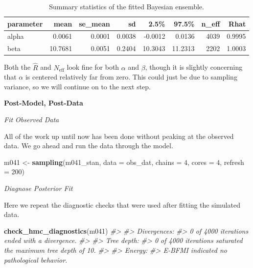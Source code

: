 \documentclass[11pt, oneside, openany]{scrbook}
\newenvironment{Shaded}{\begin{snugshade}}{\end{snugshade}}
\newcommand{\CommentTok}[1]{\textcolor[rgb]{0.56,0.35,0.01}{\textit{#1}}}
\newcommand{\DataTypeTok}[1]{\textcolor[rgb]{0.13,0.29,0.53}{#1}}
\newcommand{\DecValTok}[1]{\textcolor[rgb]{0.00,0.00,0.81}{#1}}
\newcommand{\KeywordTok}[1]{\textcolor[rgb]{0.13,0.29,0.53}{\textbf{#1}}}
\newcommand{\NormalTok}[1]{#1}
\newcommand{\StringTok}[1]{\textcolor[rgb]{0.31,0.60,0.02}{#1}}
\begin{document}
\begin{table}[!h]

\caption{\label{tab:ch041-Cloudy-Toupee}Summary statistics of the fitted Bayesian ensemble.}
\centering
\begin{tabular}[t]{lrrrrrrr}
\toprule
parameter & mean & se\_mean & sd & 2.5\% & 97.5\% & n\_eff & Rhat\\
\midrule
alpha & 0.0061 & 0.0001 & 0.0038 & -0.0012 & 0.0136 & 4039 & 0.9995\\
beta & 10.7681 & 0.0051 & 0.2404 & 10.3043 & 11.2313 & 2202 & 1.0003\\
\bottomrule
\end{tabular}
\end{table}

Both the \(\hat{R}\) and \(N_{\mathrm{eff}}\) look fine for both \(\alpha\) and \(\beta\), though it is slightly concerning that \(\alpha\) is centered relatively far from zero. This could just be due to sampling variance, so we will continue on to the next step.

\textbf{Post-Model, Post-Data}

\emph{Fit Observed Data}

All of the work up until now has been done without peaking at the observed data. We go ahead and run the data through the model.


\begin{Shaded}
\begin{Highlighting}[]
\NormalTok{m041 <-}\StringTok{ }\KeywordTok{sampling}\NormalTok{(m041_stan, }\DataTypeTok{data =}\NormalTok{ obs_dat, }
                 \DataTypeTok{chains =} \DecValTok{4}\NormalTok{, }\DataTypeTok{cores =} \DecValTok{4}\NormalTok{, }\DataTypeTok{refresh =} \DecValTok{200}\NormalTok{)}
\end{Highlighting}
\end{Shaded}


\emph{Diagnose Posterior Fit}

Here we repeat the diagnostic checks that were used after fitting the simulated data.


\begin{Shaded}
\begin{Highlighting}[]
\KeywordTok{check_hmc_diagnostics}\NormalTok{(m041)}
\CommentTok{#> }
\CommentTok{#> Divergences:}
\CommentTok{#> 0 of 4000 iterations ended with a divergence.}
\CommentTok{#> }
\CommentTok{#> Tree depth:}
\CommentTok{#> 0 of 4000 iterations saturated the maximum tree depth of 10.}
\CommentTok{#> }
\CommentTok{#> Energy:}
\CommentTok{#> E-BFMI indicated no pathological behavior.}
\end{Highlighting}
\end{Shaded}
\end{document}

